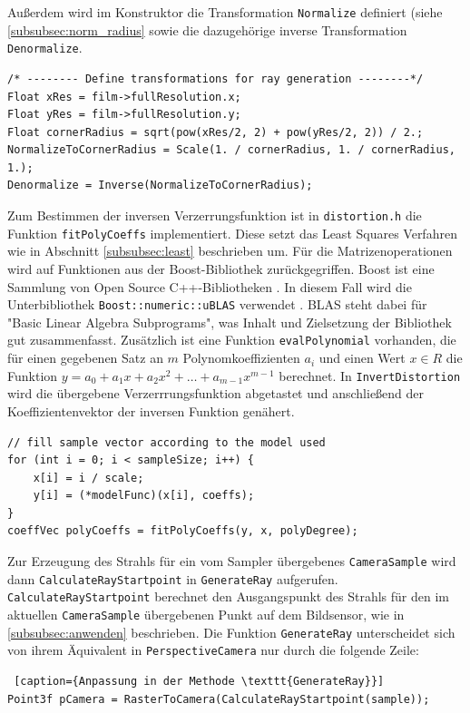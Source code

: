 Außerdem wird im Konstruktor die Transformation \texttt{Normalize} definiert (siehe \ref{subsubsec:norm_radius} sowie die dazugehörige inverse Transformation \texttt{Denormalize}.
\newpage
\begin{lstlisting}[caption={Transformation zur Normalisierung der Pixelkoordinaten}]
/* -------- Define transformations for ray generation --------*/
Float xRes = film->fullResolution.x;
Float yRes = film->fullResolution.y;
Float cornerRadius = sqrt(pow(xRes/2, 2) + pow(yRes/2, 2)) / 2.;
NormalizeToCornerRadius = Scale(1. / cornerRadius, 1. / cornerRadius, 1.);
Denormalize = Inverse(NormalizeToCornerRadius);
\end{lstlisting}

Zum Bestimmen der inversen Verzerrungsfunktion ist in \texttt{distortion.h} die Funktion \texttt{fitPolyCoeffs} implementiert. Diese setzt das Least Squares Verfahren wie in Abschnitt \ref{subsubsec:least} beschrieben um. Für die Matrizenoperationen wird auf Funktionen aus der Boost-Bibliothek zurückgegriffen. Boost ist eine Sammlung von Open Source C++-Bibliotheken \cite{boost}. In diesem Fall wird die Unterbibliothek \texttt{Boost::numeric::uBLAS} verwendet \cite{ublas}. BLAS steht dabei für "Basic Linear Algebra Subprograms", was Inhalt und Zielsetzung der Bibliothek gut zusammenfasst. Zusätzlich ist eine Funktion \texttt{evalPolynomial} vorhanden, die für einen gegebenen Satz an $m$ Polynomkoeffizienten $a_i$ und einen Wert $x \in R$ die Funktion $y = a_0 + a_1 x + a_2 x^2 + \dots + a_{m-1} x^{m-1}$ berechnet. In \texttt{InvertDistortion} wird die übergebene Verzerrrungsfunktion abgetastet und anschließend der Koeffizientenvektor der inversen Funktion genähert.
\begin{lstlisting}[caption={"Abtasten" des Verzerrungsmodells und Invertierung}]
// fill sample vector according to the model used
for (int i = 0; i < sampleSize; i++) {
	x[i] = i / scale;
	y[i] = (*modelFunc)(x[i], coeffs);
}
coeffVec polyCoeffs = fitPolyCoeffs(y, x, polyDegree);
\end{lstlisting}

Zur Erzeugung des Strahls für ein vom Sampler übergebenes \texttt{CameraSample} wird dann \texttt{CalculateRayStartpoint} in \texttt{GenerateRay} aufgerufen. \texttt{CalculateRayStartpoint} berechnet den Ausgangspunkt des Strahls für den im aktuellen \texttt{CameraSample} übergebenen Punkt auf dem Bildsensor, wie in \ref{subsubsec:anwenden} beschrieben. Die Funktion \texttt{GenerateRay} unterscheidet sich von ihrem Äquivalent in \texttt{PerspectiveCamera} nur durch die folgende Zeile:
\begin{lstlisting} [caption={Anpassung in der Methode \texttt{GenerateRay}}]
Point3f pCamera = RasterToCamera(CalculateRayStartpoint(sample));
\end{lstlisting}

